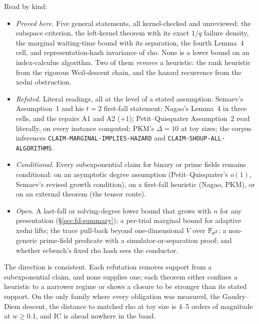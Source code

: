 Read by kind:
\begin{itemize}
\item \emph{Proved here.} Five general statements, all kernel-checked and
  unreviewed: the subspace criterion, the left-kernel theorem with its exact
  $1/q$ failure density, the marginal waiting-time bound with its separation,
  the fourth Lemma~4 cell, and representation-hash invariance of rho. None
  is a lower bound on an index-calculus algorithm. Two of them
  \emph{remove} a heuristic: the rank heuristic from the rigorous
  Weil-descent chain, and the hazard recurrence from the xedni obstruction.
\item \emph{Refuted.} Literal readings, all at the level of a stated
  assumption: Semaev's Assumption~1 and his $t=2$ first-fall statement;
  Nagao's Lemma~4 in three cells, and the repairs A1 and A2 ($+1$);
  Petit--Quisquater Assumption~2 read literally, on every instance computed;
  PKM's $\Delta=10$ at toy sizes; the corpus inferences
  \texttt{CLAIM-MARGINAL-IMPLIES-HAZARD} and
  \texttt{CLAIM-SHOUP-ALL-ALGORITHMS}.
\item \emph{Conditional.} Every subexponential claim for binary or prime
  fields remains conditional: on an asymptotic degree assumption
  (Petit--Quisquater's $o(1)$, Semaev's revised growth condition), on a
  first-fall heuristic (Nagao, PKM), or on an external theorem (the tensor
  route).
\item \emph{Open.} A last-fall or solving-degree lower bound that grows with
  $n$ for any presentation (\S\ref{sec:fd-summary}); a per-trial marginal
  bound for adaptive xedni lifts; the trace pull-back beyond
  one-dimensional $V$ over $\mathbb{F}_{p^2}$; a non-generic prime-field predicate
  with a simulator-or-separation proof; and whether ecbench's fixed rho hash
  sees the conductor.
\end{itemize}
The direction is consistent. Each refutation removes support from a
subexponential claim, and none supplies one; each theorem either confines a
heuristic to a narrower regime or shows a closure to be stronger than its
stated support. On the only family where every obligation was measured, the
Gaudry--Diem descent, the distance to matched rho at toy size is 4--5 orders
of magnitude at $w\ge0.1$, and IC is ahead nowhere in the band.
